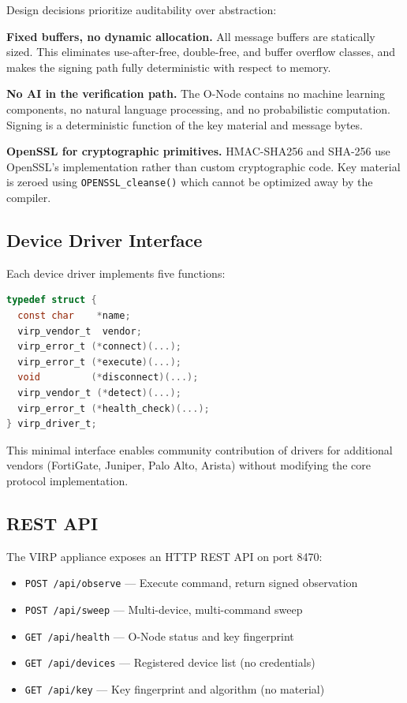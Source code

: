 \documentclass[11pt,twocolumn]{article}
\begin{document}
Design decisions prioritize auditability over abstraction:

\textbf{Fixed buffers, no dynamic allocation.} All message buffers are statically sized. This eliminates use-after-free, double-free, and buffer overflow classes, and makes the signing path fully deterministic with respect to memory.

\textbf{No AI in the verification path.} The O-Node contains no machine learning components, no natural language processing, and no probabilistic computation. Signing is a deterministic function of the key material and message bytes.

\textbf{OpenSSL for cryptographic primitives.} HMAC-SHA256 and SHA-256 use OpenSSL's implementation rather than custom cryptographic code. Key material is zeroed using \texttt{OPENSSL\_cleanse()} which cannot be optimized away by the compiler.

\subsection{Device Driver Interface}

Each device driver implements five functions:

\begin{lstlisting}[language=C]
typedef struct {
  const char    *name;
  virp_vendor_t  vendor;
  virp_error_t (*connect)(...);
  virp_error_t (*execute)(...);
  void         (*disconnect)(...);
  virp_vendor_t (*detect)(...);
  virp_error_t (*health_check)(...);
} virp_driver_t;
\end{lstlisting}

This minimal interface enables community contribution of drivers for additional vendors (FortiGate, Juniper, Palo Alto, Arista) without modifying the core protocol implementation.

\subsection{REST API}

The VIRP appliance exposes an HTTP REST API on port 8470:

\begin{itemize}[leftmargin=*]
    \item \texttt{POST /api/observe} --- Execute command, return signed observation
    \item \texttt{POST /api/sweep} --- Multi-device, multi-command sweep
    \item \texttt{GET /api/health} --- O-Node status and key fingerprint
    \item \texttt{GET /api/devices} --- Registered device list (no credentials)
    \item \texttt{GET /api/key} --- Key fingerprint and algorithm (no material)
\end{itemize}
\end{document}

